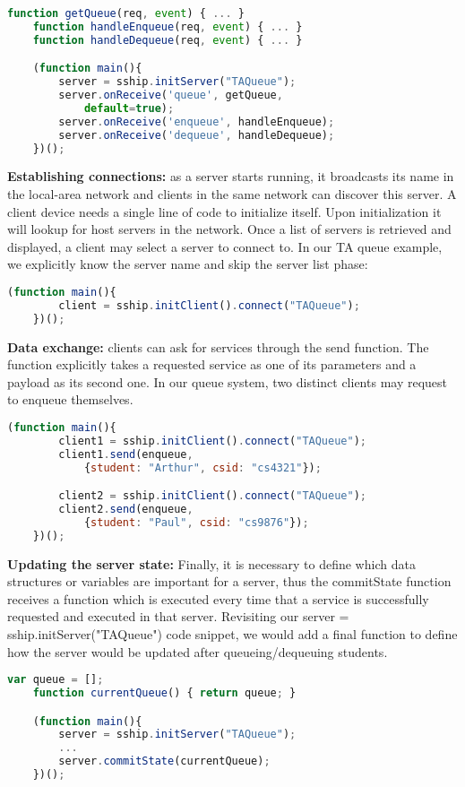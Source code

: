 \begin{lstlisting}[language=JavaScript]
    function getQueue(req, event) { ... }
    function handleEnqueue(req, event) { ... }
    function handleDequeue(req, event) { ... }

    (function main(){
        server = sship.initServer("TAQueue");
        server.onReceive('queue', getQueue, 
            default=true);
        server.onReceive('enqueue', handleEnqueue);
        server.onReceive('dequeue', handleDequeue);
    })();
\end{lstlisting}

{\bf Establishing connections: } as a server starts running, it broadcasts its name in the local-area network and clients in the same network can discover this server. A client device needs a single line of code to initialize itself. Upon initialization it will lookup for host servers in the network. Once a list of servers is retrieved and displayed, a client may select a server to connect to. In our TA queue example, we explicitly know the server name and skip the server list phase:

\begin{lstlisting}[language=JavaScript]
    (function main(){
        client = sship.initClient().connect("TAQueue");
    })();
\end{lstlisting}


{\bf Data exchange: } clients can ask for services through the {\ttfamily send} function. The function explicitly takes a requested service as one of its parameters and a payload as its second one. In our queue system, two distinct clients may request to enqueue themselves.

\begin{lstlisting}[language=JavaScript]
    (function main(){
        client1 = sship.initClient().connect("TAQueue");
        client1.send(enqueue, 
            {student: "Arthur", csid: "cs4321"});

        client2 = sship.initClient().connect("TAQueue");
        client2.send(enqueue, 
            {student: "Paul", csid: "cs9876"});
    })();
\end{lstlisting}

{\bf Updating the server state: } Finally, it is necessary to define which data structures or variables are important for a server, thus the {\ttfamily commitState} function receives a function which is executed every time that a service is successfully requested and executed in that server. Revisiting our {\ttfamily server = sship.initServer("TAQueue")} code snippet, we would add a final function to define how the server would be updated after queueing/dequeuing students.

\begin{lstlisting}[language=JavaScript]
    var queue = [];
    function currentQueue() { return queue; }

    (function main(){
        server = sship.initServer("TAQueue");
        ...
        server.commitState(currentQueue);
    })();
\end{lstlisting}
